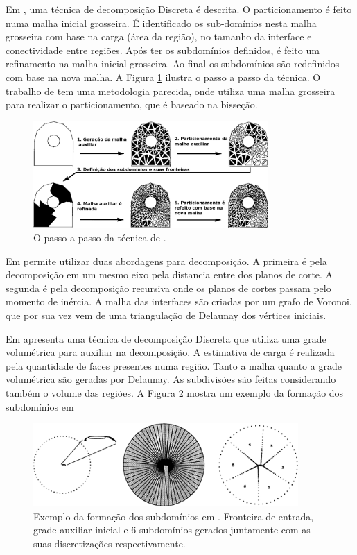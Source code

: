  
 Em \cite{bib:WU96}, uma técnica de decomposição Discreta é descrita. O particionamento é feito numa malha inicial grosseira. É identificado os sub-domínios nesta malha grosseira com base na carga (área da região), no tamanho da interface e conectividade entre regiões. Após ter os subdomínios definidos, é feito um refinamento na malha inicial grosseira. Ao final os subdomínios são redefinidos com base na nova malha. A Figura \ref{fig:wu} ilustra o passo a passo da técnica. O trabalho de \cite{bib:BANK05} tem uma metodologia parecida, onde utiliza uma malha grosseira para realizar o particionamento, que é baseado na bisseção. 
 
 \begin{figure}[htbp]
     \centering
     \includegraphics[width=0.8\textwidth]{fig/wu.png}
     \caption{O passo a passo da técnica de \cite{bib:WU96}.}
     \label{fig:wu}
 \end{figure}  

 
 Em \cite{bib:GALTIER96} permite utilizar duas abordagens para decomposição. A primeira é pela decomposição em um mesmo eixo pela distancia entre dos planos de corte. A segunda é pela decomposição recursiva onde os planos de cortes passam pelo momento de inércia. A malha das interfaces são criadas por um grafo de Voronoi, que por sua vez vem de uma triangulação de Delaunay dos vértices iniciais.
 

Em \cite{bib:SAID99} apresenta uma técnica de decomposição Discreta que utiliza uma grade volumétrica para auxiliar na decomposição. A estimativa de carga é realizada pela quantidade de faces presentes numa região. Tanto a malha quanto a grade volumétrica são geradas por Delaunay. As subdivisões são feitas considerando também o volume das regiões. A Figura \ref{fig:said} mostra um exemplo da formação dos subdomínios em


 \begin{figure}[htbp]
     \centering
     \includegraphics[width=0.9\textwidth]{fig/said.png}
     \caption{Exemplo da formação dos subdomínios em \cite{bib:SAID99}. Fronteira de entrada, grade auxiliar inicial e 6 subdomínios gerados juntamente com as suas discretizações respectivamente.}
     \label{fig:said}
 \end{figure} 


